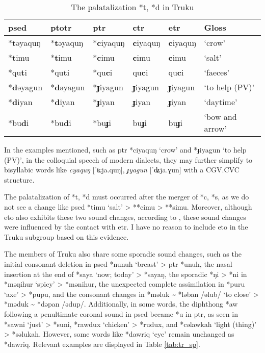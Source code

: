 \begin{table}[!htbp]
\centering
\caption{The palatalization *t, *d in Truku}
\label{tab:trtdpal}
\begin{tabular}{llllll}
\hline
\ac{psed}      & \ac{ptotr}   & \ac{ptr}     & \acs{ctr}   & \acs{etr}   & Gloss               \\ \hline
*\textbf{t}əyaquŋ  & *\textbf{t}əyaquŋ  & *\textbf{c}iyaquŋ  & \textbf{c}iyaquŋ   & \textbf{c}iyaquŋ   & `crow'          \\
*\textbf{t}imu  & *\textbf{t}imu  & *\textbf{c}imu  & \textbf{c}imu   & \textbf{c}imu   & `salt'          \\
*qu\textbf{t}i  & *qu\textbf{t}i  & *qu\textbf{c}i  & qu\textbf{c}i   & qu\textbf{c}i   & `faeces'        \\
*\textbf{d}əyagun & *\textbf{d}əyagun & *\textbf{ɟ}iyagun & \textbf{ɟ}iyagun  & \textbf{ɟ}iyagun  & `to help (PV)'       \\
*\textbf{d}iyan & *\textbf{d}iyan & *\textbf{ɟ}iyan & \textbf{ɟ}iyan  & \textbf{ɟ}iyan  & `daytime'       \\
*bu\textbf{d}i  & *bu\textbf{d}i  & *bu\textbf{ɟ}i  & bu\textbf{ɟ}i   & bu\textbf{ɟ}i   & `bow and arrow' \\ \hline
\end{tabular}
\end{table}

In the examples mentioned, such as \acl{ptr} *ciyaquŋ `crow' and *ɟiyagun `to help (PV)', in the colloquial speech of modern dialects, they may further simplify to bisyllabic words like \textit{cyaquŋ} [ˈʨja.quŋ], \textit{ɟyagun} [ˈʥja.ɣun] with a CGV.CVC structure.

The palatalization of *t, *d must occurred after the merger of *c, *s, as we do not see a change like \acl{psed} *timu `salt' > **cimu > **simu. Moreover, although \acl{eto} also exhibits these two sound changes, according to \textcite{lee2015tawsa}, these sound changes were influenced by the contact with \acl{etr}. I have no reason to include \acl{eto} in the Truku subgroup based on this evidence. 

The members of Truku also share some sporadic sound changes, such as the initial consonant deletion in \acl{psed} *nunuh `breast' > \acl{ptr} *unuh, the nasal insertion at the end of *saya `now; today' > *sayaŋ, the sporadic *ŋi > *ni in *məŋihur `spicy' > *mənihur, the unexpected complete assimilation in *puru `axe' > *pupu, and the consonant changes in *məluk \~{} *ləban /əlub/ `to close' > *məduk \~{} *dəpan /ədup/. Additionally, in some words, the diphthong *aw following a penultimate coronal sound in \acl{psed} became *u in \acl{ptr}, as seen in *sawni `just' > *suni, *rawdux `chicken' > *rudux, and *cəlawkah `light (thing)' > *səlukah. However, some words like *dawriq `eye' remain unchanged as *dawriq. Relevant examples are displayed in Table \ref{tab:tr_sp}.

